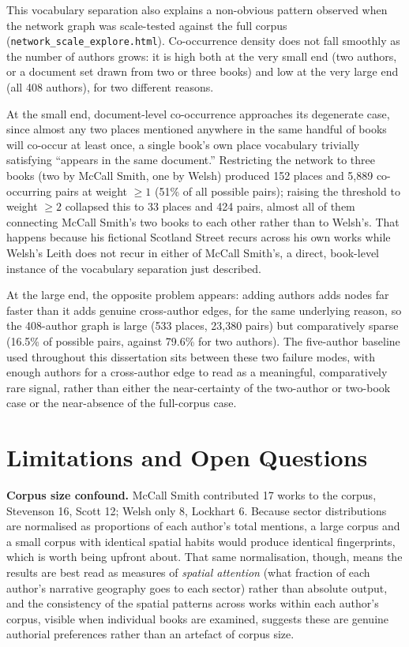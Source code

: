 \documentclass[logo,msc]{infthesis}
\begin{document}
This vocabulary separation also explains a non-obvious pattern observed when the network graph was scale-tested against the full corpus (\texttt{network\_scale\_explore.html}). Co-occurrence density does not fall smoothly as the number of authors grows: it is high both at the very small end (two authors, or a document set drawn from two or three books) and low at the very large end (all 408 authors), for two different reasons.

At the small end, document-level co-occurrence approaches its degenerate case, since almost any two places mentioned anywhere in the same handful of books will co-occur at least once, a single book's own place vocabulary trivially satisfying ``appears in the same document.'' Restricting the network to three books (two by McCall Smith, one by Welsh) produced 152 places and 5,889 co-occurring pairs at weight $\geq 1$ (51\% of all possible pairs); raising the threshold to weight $\geq 2$ collapsed this to 33 places and 424 pairs, almost all of them connecting McCall Smith's two books to each other rather than to Welsh's. That happens because his fictional Scotland Street recurs across his own works while Welsh's Leith does not recur in either of McCall Smith's, a direct, book-level instance of the vocabulary separation just described.

At the large end, the opposite problem appears: adding authors adds nodes far faster than it adds genuine cross-author edges, for the same underlying reason, so the 408-author graph is large (533 places, 23,380 pairs) but comparatively sparse (16.5\% of possible pairs, against 79.6\% for two authors). The five-author baseline used throughout this dissertation sits between these two failure modes, with enough authors for a cross-author edge to read as a meaningful, comparatively rare signal, rather than either the near-certainty of the two-author or two-book case or the near-absence of the full-corpus case.
 
\section{Limitations and Open Questions}
 
\textbf{Corpus size confound.} McCall Smith contributed 17 works to the corpus, Stevenson 16, Scott 12; Welsh only 8, Lockhart 6. Because sector distributions are normalised as proportions of each author's total mentions, a large corpus and a small corpus with identical spatial habits would produce identical fingerprints, which is worth being upfront about. That same normalisation, though, means the results are best read as measures of \emph{spatial attention} (what fraction of each author's narrative geography goes to each sector) rather than absolute output, and the consistency of the spatial patterns across works within each author's corpus, visible when individual books are examined, suggests these are genuine authorial preferences rather than an artefact of corpus size.
 
\end{document}
